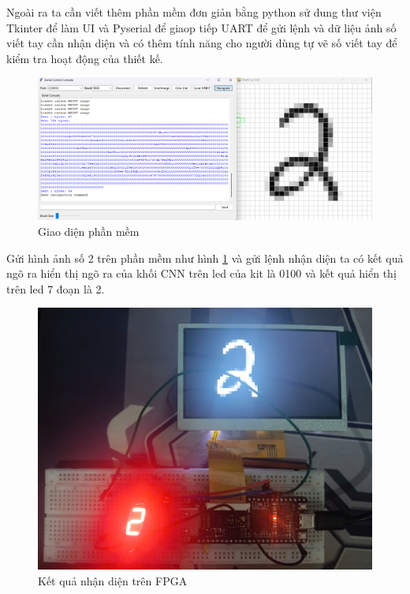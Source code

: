 Ngoài ra ta cần viết thêm phần mềm đơn giản bằng python sử dung thư viện Tkinter để làm UI và Pyserial để giaop tiếp UART để gửi lệnh và dữ liệu ảnh số viết tay cần nhận diện và có thêm tính năng cho người dùng tự vẽ số viết tay để kiểm tra hoạt động của thiết kế.
\begin{figure}[H]
    \centering
    \includegraphics[width=1\linewidth]{Images/sw.png}
    \caption{Giao diện phần mềm}
    \label{fig:sw}
\end{figure}

Gửi hình ảnh số 2 trên phần mềm như hình \ref{fig:sw} và gửi lệnh nhận diện ta có kết quả ngõ ra hiển thị ngõ ra của khối CNN trên led của kit là 0100 và kết quả hiển thị trên led 7 đoạn là 2.
\begin{figure}[H]
    \centering
    \includegraphics[width=0.75\linewidth]{Images/testr.png}
    \caption{Kết quả nhận diện trên FPGA}
    \label{fig:enter-label}
\end{figure}

